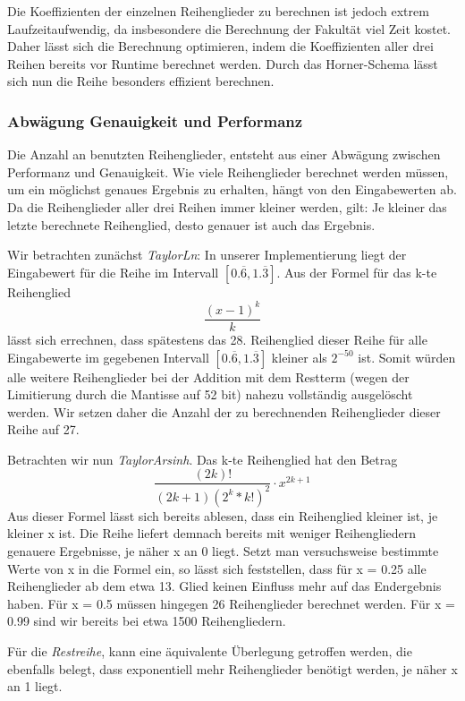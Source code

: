 \documentclass[course=erap] {aspdoc}
\begin{document}
     Die Koeffizienten der einzelnen Reihenglieder zu berechnen ist jedoch extrem Laufzeitaufwendig, da insbesondere die Berechnung der Fakultät viel Zeit kostet. Daher lässt sich die Berechnung optimieren, indem die Koeffizienten aller drei Reihen bereits vor Runtime berechnet werden. Durch das Horner-Schema lässt sich nun die Reihe besonders effizient berechnen. 
     
 
     \subsubsection{Abwägung Genauigkeit und Performanz}
     Die Anzahl an benutzten Reihenglieder, entsteht aus einer Abwägung zwischen Performanz und Genauigkeit.
     Wie viele Reihenglieder berechnet werden müssen, um ein möglichst genaues Ergebnis zu erhalten, hängt von den Eingabewerten ab. Da die Reihenglieder aller drei Reihen immer kleiner werden, gilt: Je kleiner das letzte berechnete Reihenglied, desto genauer ist auch das Ergebnis.
     
     
     Wir betrachten zunächst \textit{TaylorLn}:
     In unserer Implementierung liegt der Eingabewert für die Reihe im Intervall $[0.\overline{6}, 1.\overline{3}]$. Aus der Formel für das k-te Reihenglied 
     \[ \frac{(x - 1)^k}{k}
     \]
     lässt sich errechnen, dass spätestens das 28. Reihenglied dieser Reihe für alle Eingabewerte im gegebenen Intervall $[0.\overline{6}, 1.\overline{3}]$ kleiner als $2^{-50}$ ist. Somit würden alle weitere Reihenglieder bei der Addition mit dem Restterm (wegen der Limitierung durch die Mantisse auf 52 bit) nahezu vollständig ausgelöscht werden. Wir setzen daher die Anzahl der zu berechnenden Reihenglieder dieser Reihe auf 27.  
     
     Betrachten wir nun \textit{TaylorArsinh}. Das k-te Reihenglied hat den Betrag
     \[
     \frac{(2k)!}{(2k + 1)(2^k*k!)^2}\cdot x^{2k+1}
     \]
     Aus dieser Formel lässt sich bereits ablesen, dass ein Reihenglied kleiner ist, je kleiner x ist. Die Reihe liefert demnach bereits mit weniger Reihengliedern genauere Ergebnisse, je näher x an 0 liegt. Setzt man versuchsweise bestimmte Werte von x in die Formel ein, so lässt sich feststellen, dass für x = 0.25 alle Reihenglieder ab dem etwa 13. Glied keinen Einfluss mehr auf das Endergebnis haben. Für x = 0.5 müssen hingegen 26 Reihenglieder berechnet werden. Für x = 0.99 sind wir bereits bei etwa 1500 Reihengliedern. 
     
     Für die \textit{Restreihe}, kann eine äquivalente Überlegung getroffen werden, die ebenfalls belegt, dass exponentiell mehr Reihenglieder benötigt werden, je näher x an 1 liegt.
     
\end{document}
